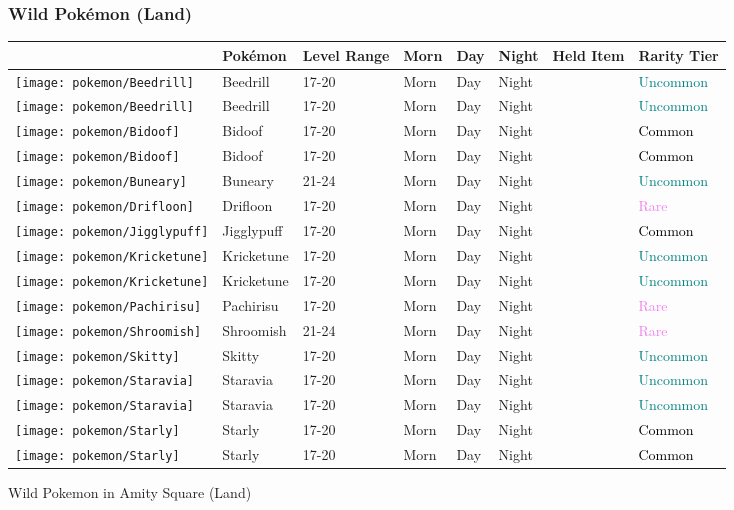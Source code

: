 \subsubsection{Wild Pokémon (Land)}%
\label{ssubsec:WildPokmon(Land)}%
\begin{longtable}{||l l l l l l l l||}%
\hline%
&Pokémon&Level Range&Morn&Day&Night&Held Item&Rarity Tier\\%
\hline%
\endhead%
\hline%
\texttt{[image: pokemon/Beedrill]}&Beedrill&17{-}20&Morn&Day&Night&&\textcolor{teal}{%
Uncommon%
}\\%
\hline%
\texttt{[image: pokemon/Beedrill]}&Beedrill&17{-}20&Morn&Day&Night&&\textcolor{teal}{%
Uncommon%
}\\%
\hline%
\texttt{[image: pokemon/Bidoof]}&Bidoof&17{-}20&Morn&Day&Night&&\textcolor{black}{%
Common%
}\\%
\hline%
\texttt{[image: pokemon/Bidoof]}&Bidoof&17{-}20&Morn&Day&Night&&\textcolor{black}{%
Common%
}\\%
\hline%
\texttt{[image: pokemon/Buneary]}&Buneary&21{-}24&Morn&Day&Night&&\textcolor{teal}{%
Uncommon%
}\\%
\hline%
\texttt{[image: pokemon/Drifloon]}&Drifloon&17{-}20&Morn&Day&Night&&\textcolor{violet}{%
Rare%
}\\%
\hline%
\texttt{[image: pokemon/Jigglypuff]}&Jigglypuff&17{-}20&Morn&Day&Night&&\textcolor{black}{%
Common%
}\\%
\hline%
\texttt{[image: pokemon/Kricketune]}&Kricketune&17{-}20&Morn&Day&Night&&\textcolor{teal}{%
Uncommon%
}\\%
\hline%
\texttt{[image: pokemon/Kricketune]}&Kricketune&17{-}20&Morn&Day&Night&&\textcolor{teal}{%
Uncommon%
}\\%
\hline%
\texttt{[image: pokemon/Pachirisu]}&Pachirisu&17{-}20&Morn&Day&Night&&\textcolor{violet}{%
Rare%
}\\%
\hline%
\texttt{[image: pokemon/Shroomish]}&Shroomish&21{-}24&Morn&Day&Night&&\textcolor{violet}{%
Rare%
}\\%
\hline%
\texttt{[image: pokemon/Skitty]}&Skitty&17{-}20&Morn&Day&Night&&\textcolor{teal}{%
Uncommon%
}\\%
\hline%
\texttt{[image: pokemon/Staravia]}&Staravia&17{-}20&Morn&Day&Night&&\textcolor{teal}{%
Uncommon%
}\\%
\hline%
\texttt{[image: pokemon/Staravia]}&Staravia&17{-}20&Morn&Day&Night&&\textcolor{teal}{%
Uncommon%
}\\%
\hline%
\texttt{[image: pokemon/Starly]}&Starly&17{-}20&Morn&Day&Night&&\textcolor{black}{%
Common%
}\\%
\hline%
\texttt{[image: pokemon/Starly]}&Starly&17{-}20&Morn&Day&Night&&\textcolor{black}{%
Common%
}\\%
\hline%
\end{longtable}%
\caption{Wild Pokemon in Amity Square (Land)}